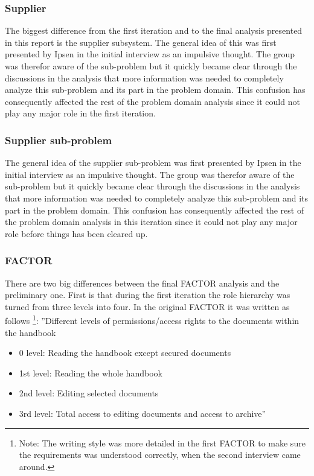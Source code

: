 \subsubsection*{Supplier} 
The biggest difference from the first iteration and to the final analysis presented in this report is the supplier subsystem.
The general idea of this was first presented by Ipsen in the initial interview as an impulsive thought. 
The group was therefor aware of the sub-problem but it quickly became clear through the discussions in the analysis that more information was needed to completely analyze this sub-problem and its part in the problem domain.
This confusion has consequently affected the rest of the problem domain analysis since it could not play any major role in the first iteration.


\subsubsection*{Supplier sub-problem}
The general idea of the supplier sub-problem was first presented by Ipsen in the initial interview as an impulsive thought. 
The group was therefor aware of the sub-problem but it quickly became clear through the discussions in the analysis that more information was needed to completely analyze this sub-problem and its part in the problem domain.
This confusion has consequently affected the rest of the problem domain analysis in this iteration since it could not play any major role  before things has been cleared up.

\subsubsection*{FACTOR}
There are two big differences between the final FACTOR analysis and the preliminary one.
First is that during the first iteration the role hierarchy was turned from three levels into four. 
In the original FACTOR it was written as follows
\footnote{Note: The writing style was more detailed in the first FACTOR to make sure the requirements was understood correctly, when the second interview came around.}:
\newline
''Different levels of permissions/access rights to the documents within the handbook
\begin{itemize}
	\item 
	0 level:
	Reading the handbook except secured documents
	\item 
	1st level:
	Reading the whole handbook
	\item 
	2nd level:
	Editing selected documents
	\item 
	3rd level:
	Total access to editing documents and access to archive''
\end{itemize}

